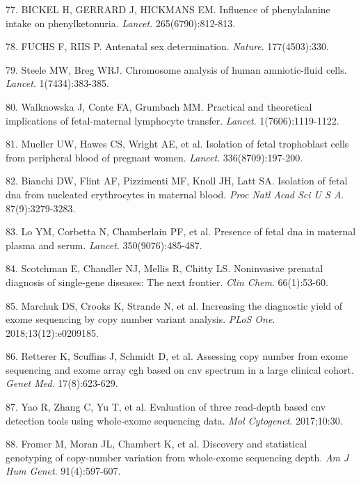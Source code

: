 \documentclass[11pt,letterpaper]{book}
\begin{document}
\leavevmode\hypertarget{ref-bickel:1953aa}{}%
77. BICKEL H, GERRARD J, HICKMANS EM. Influence of phenylalanine intake on phenylketonuria. \emph{Lancet}. 265(6790):812-813.

\leavevmode\hypertarget{ref-fuchs:1956aa}{}%
78. FUCHS F, RIIS P. Antenatal sex determination. \emph{Nature}. 177(4503):330.

\leavevmode\hypertarget{ref-steele:1966aa}{}%
79. Steele MW, Breg WRJ. Chromosome analysis of human amniotic-fluid cells. \emph{Lancet}. 1(7434):383-385.

\leavevmode\hypertarget{ref-walknowska:1969aa}{}%
80. Walknowska J, Conte FA, Grumbach MM. Practical and theoretical implications of fetal-maternal lymphocyte transfer. \emph{Lancet}. 1(7606):1119-1122.

\leavevmode\hypertarget{ref-mueller:1990aa}{}%
81. Mueller UW, Hawes CS, Wright AE, et al. Isolation of fetal trophoblast cells from peripheral blood of pregnant women. \emph{Lancet}. 336(8709):197-200.

\leavevmode\hypertarget{ref-bianchi:1990aa}{}%
82. Bianchi DW, Flint AF, Pizzimenti MF, Knoll JH, Latt SA. Isolation of fetal dna from nucleated erythrocytes in maternal blood. \emph{Proc Natl Acad Sci U S A}. 87(9):3279-3283.

\leavevmode\hypertarget{ref-lo:1997aa}{}%
83. Lo YM, Corbetta N, Chamberlain PF, et al. Presence of fetal dna in maternal plasma and serum. \emph{Lancet}. 350(9076):485-487.

\leavevmode\hypertarget{ref-scotchman:2020aa}{}%
84. Scotchman E, Chandler NJ, Mellis R, Chitty LS. Noninvasive prenatal diagnosis of single-gene diseases: The next frontier. \emph{Clin Chem}. 66(1):53-60.

\leavevmode\hypertarget{ref-marchuk:2018aa}{}%
85. Marchuk DS, Crooks K, Strande N, et al. Increasing the diagnostic yield of exome sequencing by copy number variant analysis. \emph{PLoS One}. 2018;13(12):e0209185.

\leavevmode\hypertarget{ref-retterer:2015aa}{}%
86. Retterer K, Scuffins J, Schmidt D, et al. Assessing copy number from exome sequencing and exome array cgh based on cnv spectrum in a large clinical cohort. \emph{Genet Med}. 17(8):623-629.

\leavevmode\hypertarget{ref-yao:2017aa}{}%
87. Yao R, Zhang C, Yu T, et al. Evaluation of three read-depth based cnv detection tools using whole-exome sequencing data. \emph{Mol Cytogenet}. 2017;10:30.

\leavevmode\hypertarget{ref-fromer:2012aa}{}%
88. Fromer M, Moran JL, Chambert K, et al. Discovery and statistical genotyping of copy-number variation from whole-exome sequencing depth. \emph{Am J Hum Genet}. 91(4):597-607.
\end{document}
